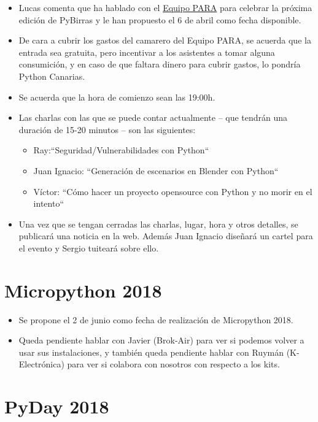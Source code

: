 \documentclass[a4paper, 12pt]{article}
\begin{document}
\begin{itemize}
    \item Lucas comenta que ha hablado con el \href{http://www.equipopara.org/}{Equipo PARA} para celebrar la próxima edición de PyBirras y le han propuesto el 6 de abril como fecha disponible.
    \item De cara a cubrir los gastos del camarero del Equipo PARA, se acuerda que la entrada sea gratuita, pero incentivar a los asistentes a tomar alguna consumición, y en caso de que faltara dinero para cubrir gastos, lo pondría Python Canarias.
    \item Se acuerda que la hora de comienzo sean las 19:00h.
    \item Las charlas con las que se puede contar actualmente -- que tendrán una duración de 15-20 minutos -- son las siguientes:
    \begin{itemize}
        \item Ray:``Seguridad/Vulnerabilidades con Python``
        \item Juan Ignacio: ``Generación de escenarios en Blender con Python``
        \item Víctor: ``Cómo hacer un proyecto opensource con Python y no morir en el intento``
    \end{itemize}
    \item Una vez que se tengan cerradas las charlas, lugar, hora y otros detalles, se publicará una noticia en la web. Además Juan Ignacio diseñará un cartel para el evento y Sergio tuiteará sobre ello.
\end{itemize}

\section{Micropython 2018}

\begin{itemize}
    \item Se propone el 2 de junio como fecha de realización de Micropython 2018.
    \item Queda pendiente hablar con Javier (Brok-Air) para ver si podemos volver a usar sus instalaciones, y también queda pendiente hablar con Ruymán (K-Electrónica) para ver si colabora con nosotros con respecto a los kits.
\end{itemize}

\section{PyDay 2018}
\end{document}
